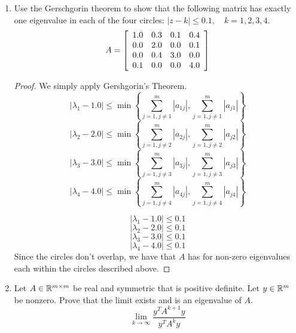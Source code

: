 \documentclass{article}
\begin{document}
\begin{enumerate}
\item  %
Use the Gerschgorin theorem to show that the following matrix has exactly one eigenvalue in each of the four circles: $|z - k| \le 0.1, \quad k = 1, 2, 3, 4$. 
\[
    A = \left[\begin{array}{c c c c} 1.0 & 0.3 & 0.1 & 0.4 \\
                                    0.0 & 2.0 & 0.0 & 0.1 \\
                                    0.0 & 0.4 & 3.0 & 0.0 \\
                                    0.1 & 0.0 & 0.0 & 4.0 \end{array}\right]
\]

\begin{proof}
    
    We simply apply Gershgorin's Theorem. 
    \[
        |\lambda_1 - 1.0| \le \min\left\{\sum_{j=1, j\neq 1}^m |a_{1j}|, \sum_{j=1, j\neq 1}^m |a_{j1}|\right\}
    \]
    \[
        |\lambda_2 - 2.0| \le \min\left\{\sum_{j=1, j\neq 2}^m |a_{2j}|, \sum_{j=1, j\neq 2}^m |a_{j2}|\right\}
    \]
    \[
        |\lambda_3 - 3.0| \le \min\left\{\sum_{j=1, j\neq 3}^m |a_{3j}|, \sum_{j=1, j\neq 3}^m |a_{j3}|\right\}
    \]
    \[
        |\lambda_4 - 4.0| \le \min\left\{\sum_{j=1, j\neq 4}^m |a_{4j}|, \sum_{j=1, j\neq 4}^m |a_{j4}|\right\}
    \]

    \[
        |\lambda_1 - 1.0| \le 0.1
    \]
    \[
        |\lambda_2 - 2.0| \le 0.1
    \]
    \[
        |\lambda_3 - 3.0| \le 0.1
    \]
    \[
        |\lambda_4 - 4.0| \le 0.1
    \]
    Since the circles don't overlap, we have that $A$ has for non-zero eigenvalues each within the circles described above. 


\end{proof}


\item %
Let $A \in \mathbb{R}^{m \times m}$ be real and symmetric that is positive definite. Let $y \in \mathbb{R}^m$ be nonzero. Prove that the limit exists and is an eigenvalue of $A$.
\[
    \lim_{k \to \infty} \frac{y^TA^{k+1}y}{y^TA^ky}
\]


\end{enumerate}
\end{document}
